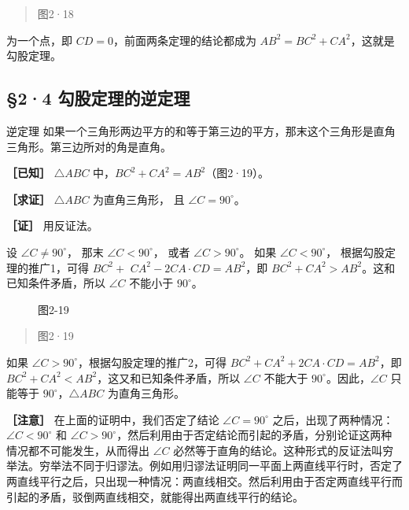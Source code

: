 \begin{quote}
图2·18
\end{quote}

为一个点，即 \(CD = 0\)，前面两条定理的结论都成为
\(AB^{2} = BC^{2} + CA^{2}\)，这就是勾股定理。

\subsection{§2·4
勾股定理的逆定理}

逆定理
如果一个三角形两边平方的和等于第三边的平方，那末这个三角形是直角三角形。第三边所对的角是直角。

\textbf{［已知］} \(\triangle ABC\)
中，\(BC^2 + CA^2 = AB^2\)（图2·19）。

\textbf{［求证］} \(\triangle ABC\) 为直角三角形， 且
\(\angle C = 90^{\circ}\)。

\textbf{［证］} 用反证法。

设 \(\angle C \neq 90^{\circ}\)， 那末 \(\angle C < 90^{\circ}\)， 或者
\(\angle C > 90^{\circ}\)。 如果 \(\angle C < 90^{\circ}\)，
根据勾股定理的推广1，可得 \(BC^{2}+\) \(CA^{2}-2CA\cdot CD=AB^{2}\)，即
\(BC^{2}+CA^{2}>AB^{2}\)。这和已知条件矛盾，所以 \(\angle C\) 不能小于
\(90^{\circ}\)。

\begin{figure}
\centering
{}
\caption{图2-19}
\end{figure}

\begin{quote}
图2·19
\end{quote}

如果 \(\angle C > 90^{\circ}\)，根据勾股定理的推广2，可得
\(BC^{2} + CA^{2} + 2CA \cdot CD = AB^{2}\)，即
\(BC^{2} + CA^{2} < AB^{2}\)，这又和已知条件矛盾，所以 \(\angle C\)
不能大于 \(90^{\circ}\)。因此，\(\angle C\) 只能等于
\(90^{\circ}\)，\(\triangle ABC\) 为直角三角形。

\textbf{［注意］} 在上面的证明中，我们否定了结论
\(\angle C = 90^{\circ}\)
之后，出现了两种情况：\(\angle C < 90^{\circ}\) 和
\(\angle C > 90^{\circ}\)，然后利用由于否定结论而引起的矛盾，分别论证这两种情况都不可能发生，从而得出
\(\angle C\)
必然等于直角的结论。这种形式的反证法叫穷举法。穷举法不同于归谬法。例如用归谬法证明同一平面上两直线平行时，否定了两直线平行之后，只出现一种情况：两直线相交。然后利用由于否定两直线平行而引起的矛盾，驳倒两直线相交，就能得出两直线平行的结论。

